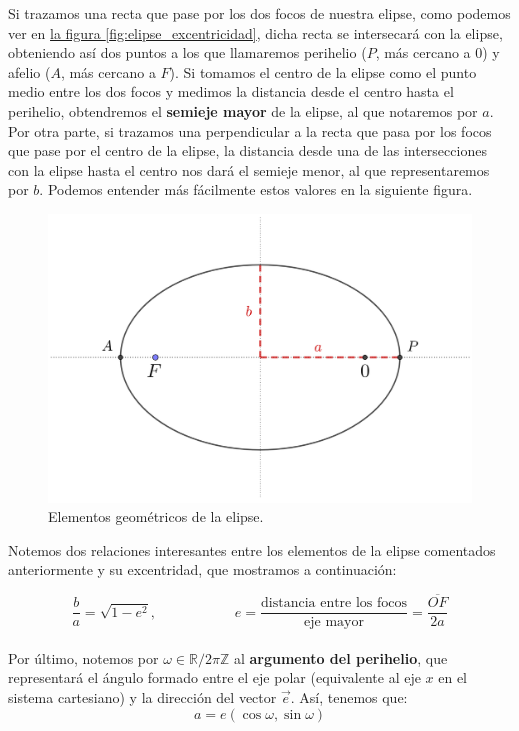 \documentclass[11pt]{article}
\begin{document}
Si trazamos una recta que pase por los dos focos de nuestra elipse, como podemos ver en \hyperref[fig:elipse_excentricidad]{la figura \ref{fig:elipse_excentricidad}}, dicha recta se intersecará con la elipse, obteniendo así dos puntos a los que llamaremos perihelio ($P$, más cercano a $0$) y afelio ($A$, más cercano a $F$). Si tomamos el centro de la elipse como el punto medio entre los dos focos y medimos la distancia desde el centro hasta el perihelio, obtendremos el \textbf{semieje mayor} de la elipse, al que notaremos por $a$. Por otra parte, si trazamos una perpendicular a la recta que pasa por los focos que pase por el centro de la elipse, la distancia desde una de las intersecciones con la elipse hasta el centro nos dará el semieje menor, al que representaremos por $b$. Podemos entender más fácilmente estos valores en la siguiente figura.

\begin{figure}[H]
\centering
\includegraphics[scale=0.12]{images/perihelio_afelio.png}
\caption{Elementos geométricos de la elipse.}
\label{fig:perihelio_afelio}
\end{figure}

Notemos dos relaciones interesantes entre los elementos de la elipse comentados anteriormente y su excentridad, que mostramos a continuación:

\[
\frac{b}{a}=\sqrt{1-e^2}, \; \; \; \; \; \; \; \; \; \; \; \; \; \; \; \; \; \; \; \; e=\frac{\text{distancia entre los focos}}{\text{eje mayor}}=\frac{\overline{OF}}{2a}
\]\\

Por último, notemos por $\omega\in\mathbb{R}/2\pi\mathbb{Z}$ al \textbf{argumento del perihelio}, que representará el ángulo formado entre el eje polar (equivalente al eje $x$ en el sistema cartesiano) y la dirección del vector $\vec{e}$. Así, tenemos que:
\[
a=e(\cos{\omega},\sin{\omega})
\]
\end{document}
